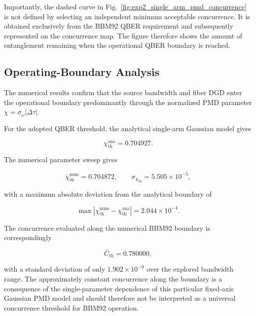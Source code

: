 Importantly, the dashed curve in
Fig.~\ref{fig:exp2_single_arm_pmd_concurrence} is not defined by selecting an
independent minimum acceptable concurrence. It is obtained exclusively from the
BBM92 QBER requirement and subsequently represented on the concurrence map.
The figure therefore shows the amount of entanglement remaining when the
operational QBER boundary is reached.



\subsection{Operating-Boundary Analysis}

The numerical results confirm that the source bandwidth and fiber DGD enter the
operational boundary predominantly through the normalized PMD parameter
\(\chi=\sigma_\omega|\Delta\tau|\).

For the adopted QBER threshold, the analytical single-arm Gaussian model gives

\begin{equation}
\chi_{\mathrm{th}}^{\mathrm{ana}}
=
0.704927.
\label{eq:exp2_analytical_chi_threshold}
\end{equation}

The numerical parameter sweep gives

\begin{equation}
\overline{\chi}_{\mathrm{th}}^{\mathrm{num}}
=
0.704872,
\qquad
\sigma_{\chi_{\mathrm{th}}}
=
5.505\times10^{-5},
\label{eq:exp2_numerical_chi_threshold}
\end{equation}

with a maximum absolute deviation from the analytical boundary of

\begin{equation}
\max
\left|
\chi_{\mathrm{th}}^{\mathrm{num}}
-
\chi_{\mathrm{th}}^{\mathrm{ana}}
\right|
=
2.044\times10^{-4}.
\label{eq:exp2_chi_boundary_error}
\end{equation}

The concurrence evaluated along the numerical BBM92 boundary is correspondingly

\begin{equation}
\overline{C}_{\mathrm{th}}
=
0.780000,
\end{equation}

with a standard deviation of only \(1.902\times10^{-9}\) over the explored
bandwidth range. The approximately constant concurrence along the boundary is a
consequence of the single-parameter dependence of this particular fixed-axis
Gaussian PMD model and should therefore not be interpreted as a universal
concurrence threshold for BBM92 operation.

